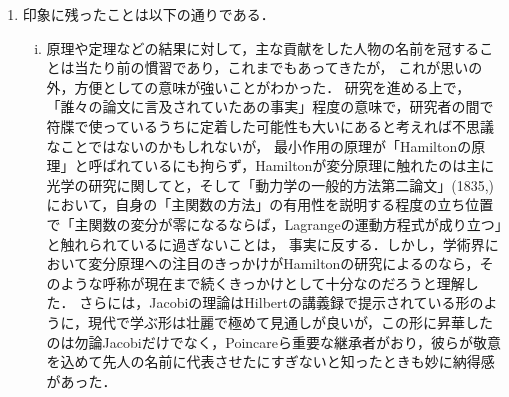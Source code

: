\documentclass[uplatex, dvipdfmx]{jsarticle}
\begin{document}
\begin{enumerate}
    \item 印象に残ったことは以下の通りである．
    \begin{enumerate}[(i)]
        \item 原理や定理などの結果に対して，主な貢献をした人物の名前を冠することは当たり前の慣習であり，これまでもあってきたが，
        これが思いの外，方便としての意味が強いことがわかった．
        研究を進める上で，「誰々の論文に言及されていたあの事実」程度の意味で，研究者の間で符牒で使っているうちに定着した可能性も大いにあると考えれば不思議なことではないのかもしれないが，
        最小作用の原理が「Hamiltonの原理」と呼ばれているにも拘らず，Hamiltonが変分原理に触れたのは主に光学の研究に関してと，そして「動力学の一般的方法第二論文」(1835,\cite{Hamilton35})において，自身の「主関数の方法」の有用性を説明する程度の立ち位置で「主関数の変分が零になるならば，Lagrangeの運動方程式が成り立つ」と触れられているに過ぎないことは，
        事実に反する．しかし，学術界において変分原理への注目のきっかけがHamiltonの研究によるのなら，そのような呼称が現在まで続くきっかけとして十分なのだろうと理解した．
        さらには，Jacobiの理論はHilbertの講義録\cite{Hilbert37}で提示されている形のように，現代で学ぶ形は壮麗で極めて見通しが良いが，この形に昇華したのは勿論Jacobiだけでなく，Poincareら重要な継承者がおり，彼らが敬意を込めて先人の名前に代表させたにすぎないと知ったときも妙に納得感があった．
        

\end{enumerate}
\end{enumerate}
\end{document}
